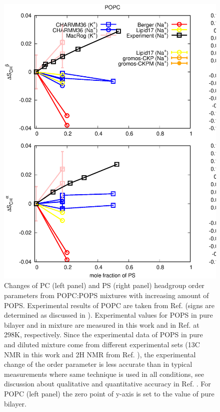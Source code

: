 \documentclass[aps,prl,superscriptaddress,twocolumn]{revtex4}
\begin{document}
\begin{figure}[]
  \centering
  \includegraphics[width=16.0cm]{../Figs/HGorderparametersPCvsPS.eps}
  \caption{\label{HGorderparametersPCvsPS}
    Changes of PC (left panel) and PS (right panel) headgroup order parameters
    from POPC:POPS mixtures with increasing amount of POPS.
    Experimental results of POPC are taken from Ref. 
    (signs are determined as discussed in \cite{botan15,ollila16}).
    Experimental values for POPS in pure bilayer and in mixture are  
    measured in this work and in Ref.  at 298K, respectively.
    Since the experimental data of POPS in pure and diluted mixture come from
    different experimental sets (13C NMR in this work and 2H NMR from Ref. ),
    the experimental change of the order parameter is less accurate than in typical measurements
    where same technique is used in all conditions, see discussion about qualitative and quantitative 
    accuracy in Ref. .
    For POPC (left panel) the zero point of y-axis is set to the value of pure bilayer.
}
\end{figure}
\end{document}
